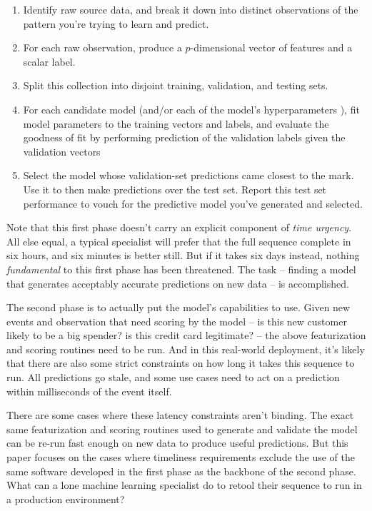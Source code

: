 \documentclass[tablecaption=bottom,wcp]{jmlr}
\begin{document}
\begin{enumerate}
 \item Identify raw source data, and break it down into distinct observations of
the pattern you're trying to learn and predict.
 \item For each raw observation, produce a $p$-dimensional vector of features
and a scalar label.
 \item Split this collection into disjoint training, validation, and testing
sets.
 \item For each candidate model (and/or each of the model's hyperparameters
 ), fit model parameters to the training vectors and labels, and
evaluate the goodness of fit by performing prediction of the validation labels
given the validation vectors
 \item Select the model whose validation-set predictions came closest to the
mark. Use it to then make predictions over the test set. Report this test set
performance to vouch for the predictive model you've generated and selected.
\end{enumerate}

 Note that this first phase doesn't carry an explicit component of \emph{time
urgency}. All else equal, a typical specialist will prefer that the full
sequence complete in six hours, and six minutes is better still. But if it takes
six days instead, nothing \emph{fundamental} to this first phase has been
threatened. The task -- finding a model that generates acceptably accurate
predictions on new data -- is accomplished.

 The second phase is to actually put the model's capabilities to use. Given new
events and observation that need scoring by the model -- is this new customer
likely to be a big spender? is this credit card legitimate? -- the above
featurization and scoring routines need to be run. And in this real-world
deployment, it's likely that there are also some strict constraints on how long
it takes this sequence to run. All predictions go stale, and some use cases need
to act on a prediction within milliseconds of the event itself.

 There are some cases where these latency constraints aren't binding. The exact
same featurization and scoring routines used to generate and validate the model
can be re-run fast enough on new data to produce useful predictions. But this
paper focuses on the cases where timeliness requirements exclude the use of the
same software developed in the first phase as the backbone of the second phase.
What can a lone machine learning specialist do to retool their sequence to run
in a production environment?
\end{document}
